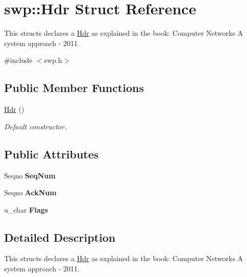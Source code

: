 \hypertarget{structswp_1_1Hdr}{}\section{swp\+:\+:Hdr Struct Reference}
\label{structswp_1_1Hdr}


This structs declares a \hyperlink{structswp_1_1Hdr}{Hdr} as explained in the book\+: Computer Networks A system approach -\/ 2011.  




{\ttfamily \#include $<$swp.\+h$>$}

\subsection*{Public Member Functions}
\begin{DoxyCompactItemize}
\item 
\hyperlink{structswp_1_1Hdr_aa66b283dc051d983ecfce1fd51ae25bf}{Hdr} ()
\begin{DoxyCompactList}\small\item\em Default constructor. \end{DoxyCompactList}\end{DoxyCompactItemize}
\subsection*{Public Attributes}
\begin{DoxyCompactItemize}
\item 
Seqno {\bfseries Seq\+Num}\hypertarget{structswp_1_1Hdr_a2c4899f7de5ac69d97e0944abadfd80a}{}\label{structswp_1_1Hdr_a2c4899f7de5ac69d97e0944abadfd80a}

\item 
Seqno {\bfseries Ack\+Num}\hypertarget{structswp_1_1Hdr_a8f1b40013225b925c8e88d4486d24733}{}\label{structswp_1_1Hdr_a8f1b40013225b925c8e88d4486d24733}

\item 
u\+\_\+char {\bfseries Flags}\hypertarget{structswp_1_1Hdr_a7e60a051ee14be6f6eb1da4f8a01b7a9}{}\label{structswp_1_1Hdr_a7e60a051ee14be6f6eb1da4f8a01b7a9}

\end{DoxyCompactItemize}


\subsection{Detailed Description}
This structs declares a \hyperlink{structswp_1_1Hdr}{Hdr} as explained in the book\+: Computer Networks A system approach -\/ 2011. 

